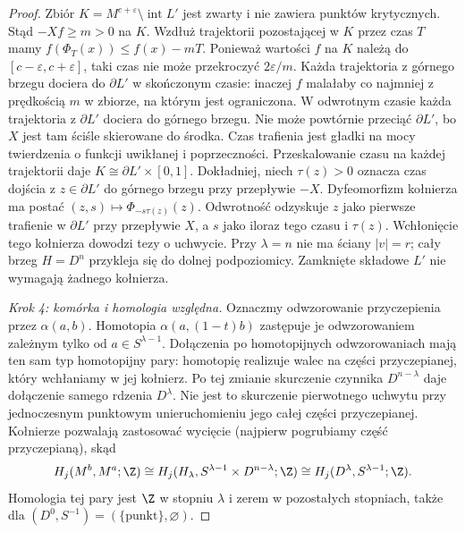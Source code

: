 \begin{proof}
Zbiór $K=M^{c+\varepsilon}\setminus\operatorname{int}L'$
jest zwarty i nie zawiera punktów krytycznych.
Stąd $-Xf\geq m>0$ na $K$.
Wzdłuż trajektorii pozostającej w $K$ przez czas $T$
mamy $f(\Phi_T(x))\leq f(x)-mT$.
Ponieważ wartości $f$ na $K$ należą do $[c-\varepsilon,c+\varepsilon]$,
taki czas nie może przekroczyć $2\varepsilon/m$.
Każda trajektoria z górnego brzegu dociera do $\partial L'$
w skończonym czasie: inaczej $f$ malałaby co najmniej
z prędkością $m$ w zbiorze, na którym jest ograniczona.
W odwrotnym czasie każda trajektoria z $\partial L'$
dociera do górnego brzegu. Nie może powtórnie przeciąć
$\partial L'$, bo $X$ jest tam ściśle skierowane do środka.
Czas trafienia jest gładki na mocy twierdzenia
o funkcji uwikłanej i poprzeczności.
Przeskalowanie czasu na każdej trajektorii daje
$K\cong\partial L'\times[0,1]$.
Dokładniej, niech $\tau(z)>0$ oznacza czas dojścia
z $z\in\partial L'$ do górnego brzegu przy przepływie $-X$.
Dyfeomorfizm kołnierza ma postać
$(z,s)\mapsto\Phi_{-s\tau(z)}(z)$.
Odwrotność odzyskuje $z$ jako pierwsze trafienie w $\partial L'$
przy przepływie $X$, a $s$ jako iloraz tego czasu i $\tau(z)$.
Wchłonięcie tego kołnierza dowodzi tezy o uchwycie.
Przy $\lambda=n$ nie ma ściany $|v|=r$;
cały brzeg $H=D^n$ przykleja się do dolnej podpoziomicy.
Zamknięte składowe $L'$ nie wymagają żadnego kołnierza.

\emph{Krok 4: komórka i homologia względna.}
Oznaczmy odwzorowanie przyczepienia przez $\alpha(a,b)$.
Homotopia $\alpha(a,(1-t)b)$ zastępuje je odwzorowaniem
zależnym tylko od $a\in S^{\lambda-1}$.
Dołączenia po homotopijnych odwzorowaniach mają ten sam typ
homotopijny pary: homotopię realizuje walec na części
przyczepianej, który wchłaniamy w jej kołnierz.
Po tej zmianie skurczenie czynnika $D^{n-\lambda}$
daje dołączenie samego rdzenia $D^\lambda$.
Nie jest to skurczenie pierwotnego uchwytu
przy jednoczesnym punktowym unieruchomieniu jego całej
części przyczepianej.
Kołnierze pozwalają zastosować wycięcie
(najpierw pogrubiamy część przyczepianą), skąd
\[
 H_j(M^b,M^a;\Z)
 \cong H_j(H_\lambda,S^{\lambda-1}\times D^{n-\lambda};\Z)
 \cong H_j(D^\lambda,S^{\lambda-1};\Z).
\]
Homologia tej pary jest $\Z$ w stopniu $\lambda$
i zerem w pozostałych stopniach, także dla
$(D^0,S^{-1})=(\{\mathrm{punkt}\},\varnothing)$.
\end{proof}

